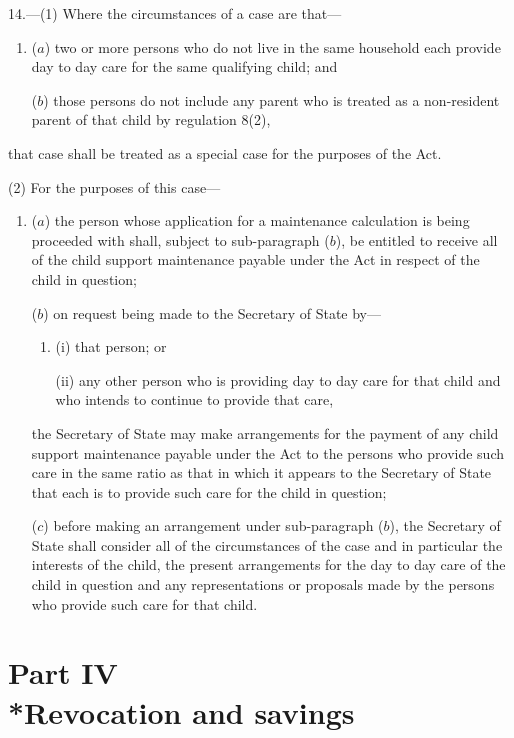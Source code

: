 \documentclass[12pt,a4paper]{article}
\begin{document}
14.---(1)  Where the circumstances of a case are that—
\begin{enumerate}\item[]
($a$) two or more persons who do not live in the same household each provide day to day care for the same qualifying child; and

($b$) those persons do not include any parent who is treated as a non-resident parent of that child by regulation 8(2),
\end{enumerate}
that case shall be treated as a special case for the purposes of the Act.

(2) For the purposes of this case—
\begin{enumerate}\item[]
($a$) the person whose application for a maintenance calculation is being proceeded with shall, subject to sub-paragraph ($b$), be entitled to receive all of the child support maintenance payable under the Act in respect of the child in question;

($b$) on request being made to the Secretary of State by—
\begin{enumerate}\item[]
(i) that person; or

(ii) any other person who is providing day to day care for that child and who intends to continue to provide that care,
\end{enumerate}
the Secretary of State may make arrangements for the payment of any child support maintenance payable under the Act to the persons who provide such care in the same ratio as that in which it appears to the Secretary of State that each is to provide such care for the child in question;

($c$) before making an arrangement under sub-paragraph ($b$), the Secretary of State shall consider all of the circumstances of the case and in particular the interests of the child, the present arrangements for the day to day care of the child in question and any representations or proposals made by the persons who provide such care for that child.
\end{enumerate}

\section[Part IV --- Revocation and savings]{Part IV\\*Revocation and savings}

\renewcommand\parthead{--- Part IV}
\end{document}
